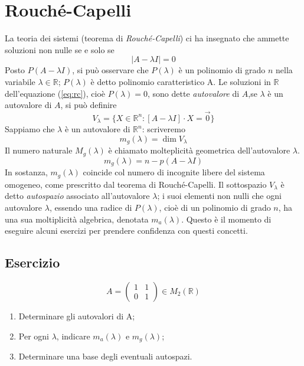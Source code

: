 \documentclass{book}
\newcommand{\abs}[1]{\lvert#1\rvert}
\begin{document}
\section{Rouché-Capelli}
\label{sec:rouche-capelli}
La teoria dei sistemi (teorema di \textit{Rouché-Capelli}) ci ha insegnato che ammette
soluzioni non nulle se e solo se
\begin{equation}
  \label{eq:rc}
  \abs{A-\lambda I}=0
\end{equation}
Posto $P(A-\lambda I)$, si può osservare che $P(\lambda)$ è un polinomio di grado $n$ nella variabile $\lambda \in \mathds{R}$; $P(\lambda)$ 
è detto polinomio caratteristico A. Le soluzioni in $\mathds{R}$ dell'equazione (\ref{eq:rc}), cioè $P(\lambda)=0$, sono dette \textit{autovalore}
di $A$,se $\lambda$ è un autovalore di $A$, si può definire
\begin{equation*}
  V_\lambda =\{X\in\mathds{R}^n:[A-\lambda I]\cdot X=\vec{0}\}
\end{equation*}
Sappiamo che $\lambda$ è un autovalore di $\mathds{R}^n$: scriveremo
\begin{equation*}
  m_g(\lambda)=\dim V_\lambda
\end{equation*}
Il numero naturale $M_g(\lambda)$ è chiamato molteplicità geometrica dell'autovalore $\lambda$.
\begin{equation*}
  m_g(\lambda)=n-p(A-\lambda I)
\end{equation*}
In sostanza, $m_g(\lambda)$ coincide col numero di incognite libere del sistema omogeneo, come prescritto dal teorema di Rouché-Capelli. Il sottospazio
$V_\lambda$ è detto \textit{autospazio} associato all'autovalore $\lambda$; i suoi elementi non nulli che ogni autovalore $\lambda$, essendo una radice
di $P(\lambda)$, cioè di un polinomio di grado $n$, ha una sua moltiplicità algebrica, denotata $m_a(\lambda)$. Questo è il momento di eseguire alcuni
esercizi per prendere confidenza con questi concetti.

\subsection{Esercizio}
\label{sec:esAutovettori}

\begin{equation}
  \label{eq:esAuto}
  A=
  \begin{pmatrix}
    1 & 1\\
    0 & 1 
  \end{pmatrix} \in M_2 (\mathds{R})
\end{equation}
\begin{enumerate}
\item Determinare gli autovalori di A;
\item Per ogni $\lambda$, indicare $m_a(\lambda)$ e $m_g(\lambda)$;
\item Determinare una base degli eventuali autospazi.
\end{enumerate}
\end{document}
